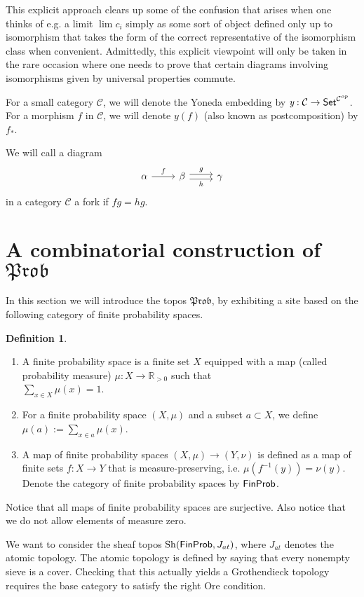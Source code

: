 \documentclass[a4paper]{amsproc}
\theoremstyle{plain}
\theoremstyle{definition}
\newtheorem{definition}[theorem]{Definition}
\theoremstyle{remark}
\numberwithin{equation}{section}
\DeclareMathOperator{\Sh}{Sh}
\newcommand{\y}{\textit{y}}
\DeclareMathOperator*{\limit}{lim}
\newcommand{\Set}{\textup{\textsf{Set}}}
\newcommand{\FinProb}{\textup{\textsf{FinProb}}}
\newcommand{\C}{\mathcal{C}}
\newcommand{\Prob}{\mathfrak{Prob}}
\begin{document}
This explicit approach clears up some of the confusion that arises when one thinks of e.g. a limit $\limit c_i$ simply as some sort of object defined only up to isomorphism that takes the form of the correct representative of the isomorphism class when convenient. Admittedly, this explicit viewpoint will only be taken in the rare occasion where one needs to prove that certain diagrams involving isomorphisms given by universal properties commute.

For a small category $\C$, we will denote the Yoneda embedding by $\y: \C \to \Set^{\C^{op}}$. For a morphism $f$ in $\C$, we will denote $\y(f)$ (also known as postcomposition) by $f_*$.

We will call a diagram
\[
\begin{tikzcd}
\alpha \arrow[r, "f"] & \beta \arrow[r, "g", shift left] \arrow[r, "h"', shift right] & \gamma
\end{tikzcd}
\]
in a category $\C$ a fork if $fg = hg$.


\section{A combinatorial construction of $\Prob$}

In this section we will introduce the topos $\Prob$, by exhibiting a site based on the following category of finite probability spaces.

\begin{definition}
\begin{enumerate}
\item A finite probability space is a finite set $X$ equipped with a map (called probability measure) $\mu: X \to \mathbb{R}_{>0}$ such that \\ $\sum_{x \in X} \mu(x) = 1$.
\item For a finite probability space $(X,\mu)$ and a subset $a \subset X$, we define $\mu(a) := \sum_{x \in a} \mu(x)$.
\item A map of finite probability spaces $(X,\mu) \to (Y,\nu)$ is defined as a map of finite sets $f: X \to Y$ that is measure-preserving, i.e. $\mu(f^{-1}(y)) = \nu(y)$. Denote the category of finite probability spaces by $\FinProb$.
\end{enumerate}
\end{definition}

Notice that all maps of finite probability spaces are surjective. Also notice that we do not allow elements of measure zero.

We want to consider the sheaf topos $\Sh(\FinProb, J_{at})$, where $J_{at}$ denotes the atomic topology. The atomic topology is defined by saying that every nonempty sieve is a cover. Checking that this actually yields a Grothendieck topology requires the base category to satisfy the right Ore condition.
\end{document}
